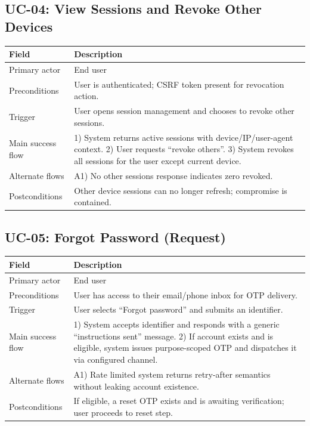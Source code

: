\documentclass[11pt]{article}
\begin{document}
    \subsection{UC-04: View Sessions and Revoke Other Devices}
    \begin{tabularx}{\textwidth}{@{}lX@{}}
\toprule
\textbf{Field} & \textbf{Description} \\
\midrule
Primary actor & End user \\
Preconditions & User is authenticated; CSRF token present for revocation action. \\
Trigger & User opens session management and chooses to revoke other sessions. \\
Main success flow &
1) System returns active sessions with device/IP/user-agent context. 2) User requests ``revoke others''. 3) System revokes all sessions for the user except current device. \\
Alternate flows & A1) No other sessions \textrightarrow{} response indicates zero revoked. \\
Postconditions & Other device sessions can no longer refresh; compromise is contained. \\
\bottomrule
    \end{tabularx}

    \subsection{UC-05: Forgot Password (Request)}
    \begin{tabularx}{\textwidth}{@{}lX@{}}
\toprule
\textbf{Field} & \textbf{Description} \\
\midrule
Primary actor & End user \\
Preconditions & User has access to their email/phone inbox for OTP delivery. \\
Trigger & User selects ``Forgot password'' and submits an identifier. \\
Main success flow &
1) System accepts identifier and responds with a generic ``instructions sent'' message. 2) If account exists and is eligible, system issues purpose-scoped OTP and dispatches it via configured channel. \\
Alternate flows & A1) Rate limited \textrightarrow{} system returns retry-after semantics without leaking account existence. \\
Postconditions & If eligible, a reset OTP exists and is awaiting verification; user proceeds to reset step. \\
\bottomrule
    \end{tabularx}
\end{document}
